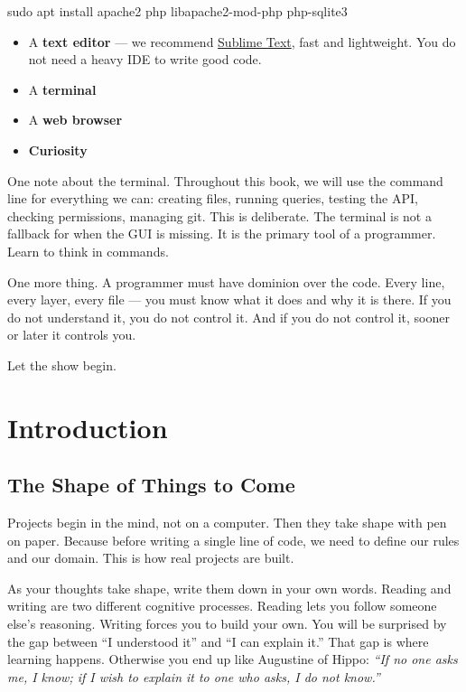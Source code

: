 \documentclass[11pt,a4paper,oneside]{book}
\newenvironment{Shaded}{\begin{snugshade}}{\end{snugshade}}
\newcommand{\FunctionTok}[1]{\textcolor[HTML]{06287E}{#1}}
\newcommand{\NormalTok}[1]{#1}
\providecommand{\tightlist}{%
  \setlength{\itemsep}{0pt}\setlength{\parskip}{0pt}}
\begin{document}
\begin{Shaded}
\begin{Highlighting}[]
\FunctionTok{sudo}\NormalTok{ apt install apache2 php libapache2{-}mod{-}php php{-}sqlite3}
\end{Highlighting}
\end{Shaded}

\begin{itemize}
\tightlist
\item
  A \textbf{text editor} --- we recommend
  \href{https://www.sublimetext.com/}{Sublime Text}, fast and
  lightweight. You do not need a heavy IDE to write good code.
\item
  A \textbf{terminal}
\item
  A \textbf{web browser}
\item
  \textbf{Curiosity}
\end{itemize}

One note about the terminal. Throughout this book, we will use
the command line for everything we can: creating files, running
queries, testing the API, checking permissions, managing git.
This is deliberate. The terminal is not a fallback for when the
GUI is missing. It is the primary tool of a programmer. Learn to
think in commands.

One more thing. A programmer must have dominion over the code.
Every line, every layer, every file --- you must know what it
does and why it is there. If you do not understand it, you do not
control it. And if you do not control it, sooner or later it
controls you.

Let the show begin.

\newpage

\hypertarget{introduction}{%
\chapter{Introduction}\label{introduction}}

\hypertarget{the-shape-of-things-to-come}{%
\section{The Shape of Things to
Come}\label{the-shape-of-things-to-come}}

Projects begin in the mind, not on a computer. Then they take
shape with pen on paper. Because before writing a single line of
code, we need to define our rules and our domain. This is how
real projects are built.

As your thoughts take shape, write them down in your own words.
Reading and writing are two different cognitive processes.
Reading lets you follow someone else's reasoning. Writing forces
you to build your own. You will be surprised by the gap between
``I understood it'' and ``I can explain it.'' That gap is where
learning happens. Otherwise you end up like Augustine of Hippo:
\emph{``If no one asks me, I know; if I wish to explain it to one
who asks, I do not know.''}
\end{document}
